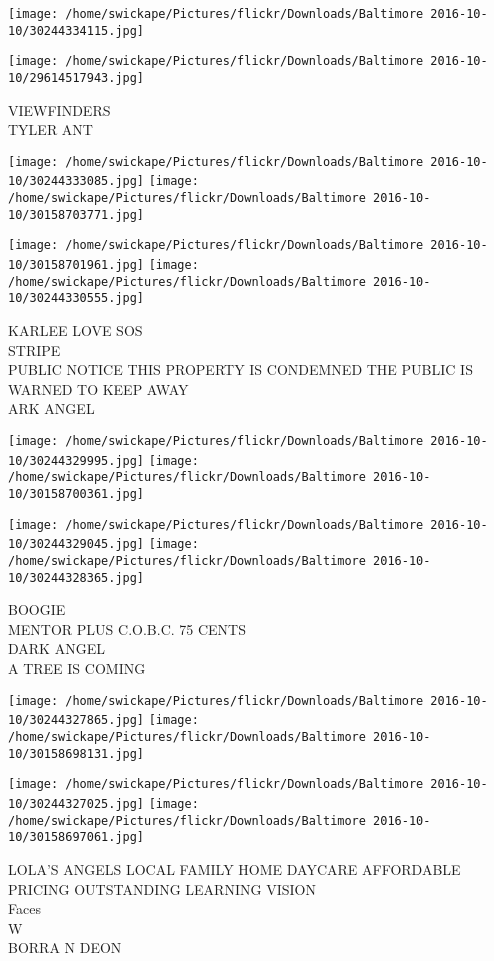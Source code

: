 \documentclass[10pt,letterpaper]{article}
\begin{document}
\texttt{[image: /home/swickape/Pictures/flickr/Downloads/Baltimore 2016-10-10/30244334115.jpg]}

\vspace{0.25in}
\texttt{[image: /home/swickape/Pictures/flickr/Downloads/Baltimore 2016-10-10/29614517943.jpg]}

VIEWFINDERS\\
TYLER ANT
\pagebreak

\texttt{[image: /home/swickape/Pictures/flickr/Downloads/Baltimore 2016-10-10/30244333085.jpg]}
\texttt{[image: /home/swickape/Pictures/flickr/Downloads/Baltimore 2016-10-10/30158703771.jpg]}

\texttt{[image: /home/swickape/Pictures/flickr/Downloads/Baltimore 2016-10-10/30158701961.jpg]}
\texttt{[image: /home/swickape/Pictures/flickr/Downloads/Baltimore 2016-10-10/30244330555.jpg]}

KARLEE LOVE SOS\\
STRIPE\\
PUBLIC NOTICE THIS PROPERTY IS CONDEMNED THE PUBLIC IS WARNED TO KEEP AWAY\\
ARK ANGEL
\pagebreak

\texttt{[image: /home/swickape/Pictures/flickr/Downloads/Baltimore 2016-10-10/30244329995.jpg]}
\texttt{[image: /home/swickape/Pictures/flickr/Downloads/Baltimore 2016-10-10/30158700361.jpg]}

\texttt{[image: /home/swickape/Pictures/flickr/Downloads/Baltimore 2016-10-10/30244329045.jpg]}
\texttt{[image: /home/swickape/Pictures/flickr/Downloads/Baltimore 2016-10-10/30244328365.jpg]}

BOOGIE\\
MENTOR PLUS C.O.B.C. 75 CENTS\\
DARK ANGEL\\
A TREE IS COMING
\pagebreak

\texttt{[image: /home/swickape/Pictures/flickr/Downloads/Baltimore 2016-10-10/30244327865.jpg]}
\texttt{[image: /home/swickape/Pictures/flickr/Downloads/Baltimore 2016-10-10/30158698131.jpg]}

\texttt{[image: /home/swickape/Pictures/flickr/Downloads/Baltimore 2016-10-10/30244327025.jpg]}
\texttt{[image: /home/swickape/Pictures/flickr/Downloads/Baltimore 2016-10-10/30158697061.jpg]}

LOLA'S ANGELS LOCAL FAMILY HOME DAYCARE AFFORDABLE PRICING OUTSTANDING LEARNING VISION\\
Faces\\
W\\
BORRA N DEON
\pagebreak
\end{document}
